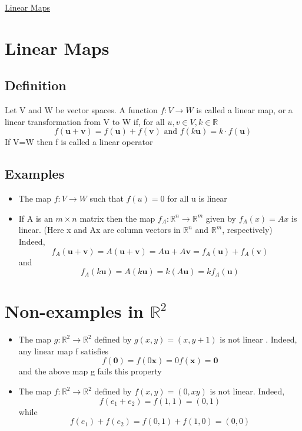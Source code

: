 \documentclass{article}[18pt]
\begin{document}
\begin{center}
\underline{\huge Linear Maps}
\end{center}
\section{Linear Maps}
\subsection{Definition}
Let V and W be vector spaces. A function $f: V\rightarrow W$ is called a linear map, or a linear transformation from V to W if, for all $u,v\in V, k\in \mathbb{R}$
$$f ( \mathbf { u } + \mathbf { v } ) = f ( \mathbf { u } ) + f ( \mathbf { v } ) \text { and } f ( k \mathbf { u } ) = k \cdot f ( \mathbf { u } )$$
If V=W then f is called a linear operator
\subsection{Examples}
\begin{itemize}
	\item The map $f:V\rightarrow W$ such that $f(u)=0$ for all u is linear
	\item If A is an $m\times n$ matrix then the map $f_A:\mathbb{R}^n\rightarrow \mathbb{R}^m$ given by $f_A(x)=Ax$ is linear. (Here x and Ax are column vectors in $\mathbb{R}^n$ and $\mathbb{R}^m$, respectively)\\
	Indeed,
	$$f _ { A } ( \mathbf { u } + \mathbf { v } ) = A ( \mathbf { u } + \mathbf { v } ) = A \mathbf { u } + A \mathbf { v } = f _ { A } ( \mathbf { u } ) + f _ { A } ( \mathbf { v } )$$
	and
	$$f _ { A } ( k \mathbf { u } ) = A ( k \mathbf { u } ) = k ( A \mathbf { u } ) = k f _ { A } ( \mathbf { u } )$$
\end{itemize}
\section{Non-examples in $\mathbb{R}^2$}
\begin{itemize}
	\item The map $g: \mathbb{R}^2\rightarrow \mathbb{R}^2$ defined by $g(x,y)=(x,y+1)$ is not linear . Indeed, any linear map f satisfies
	$$f ( \mathbf { 0 } ) = f ( 0 \mathbf { x } ) = 0 f ( \mathbf { x } ) = \mathbf { 0 }$$
	and the above map g fails this property
	\item The map $f: \mathbb{R}^2\rightarrow \mathbb{R}^2$ defined by $f(x,y)=(0,xy)$ is not linear. Indeed,
	$$f(e_1+e_2)=f(1,1)=(0,1)$$
	while
	$$f(e_1)+f(e_2)=f(0,1)+f(1,0)=(0,0)$$
\end{itemize}
\end{document}

